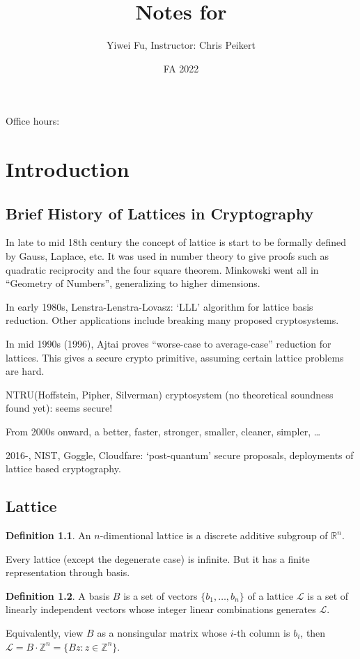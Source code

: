 \documentclass{report}
\newcommand{\R}{\mathbb{R}}
\newcommand{\Z}{\mathbb{Z}}
\theoremstyle{definition}
\newtheorem{definition}{Definition}[section]
\theoremstyle{remark}
\numberwithin{equation}{section}
\begin{document}
\title{Notes for}
\author{Yiwei Fu, Instructor: Chris Peikert}
\date{FA 2022}
\maketitle


\tableofcontents
Office hours: 

\clearpage
{}

\chapter{Introduction}
\section{Brief History of Lattices in Cryptography}
In late to mid 18th century the concept of lattice is start to be formally defined by Gauss, Laplace, etc. It was used in number theory to give proofs such as quadratic reciprocity and the four square theorem. Minkowski went all in ``Geometry of Numbers'', generalizing to higher dimensions.

In early 1980s, Lenstra-Lenstra-Lovasz: `LLL' algorithm for lattice basis reduction. Other applications include breaking many proposed cryptosystems.

In mid 1990s (1996), Ajtai proves ``worse-case to average-case'' reduction for lattices. This gives a secure crypto primitive, assuming certain lattice problems are hard. 

NTRU(Hoffstein, Pipher, Silverman) cryptosystem (no theoretical soundness found yet): seems secure!

From 2000s onward, a better, faster, stronger, smaller, cleaner, simpler, \ldots

2016-, NIST, Goggle, Cloudfare: `post-quantum' secure proposals, deployments of lattice based cryptography.

\section{Lattice}
\begin{definition}
    An $n$-dimentional lattice is a discrete additive subgroup of $\R^n$.
\end{definition}

Every lattice (except the degenerate case) is infinite. But it has a finite representation through basis.
\begin{definition}
    A basis $B$ is a set of vectors $\{b_1, \ldots, b_n\}$ of a lattice $\mathcal{L}$ is a set of linearly independent vectors whose integer linear combinations generates $\mathcal{L}$.

    Equivalently, view $B$ as a nonsingular matrix whose $i$-th column is $b_i$, then $\mathcal{L} = B \cdot \Z^n = \{Bz: z \in \Z^n\}$.
\end{definition}
\end{document}
